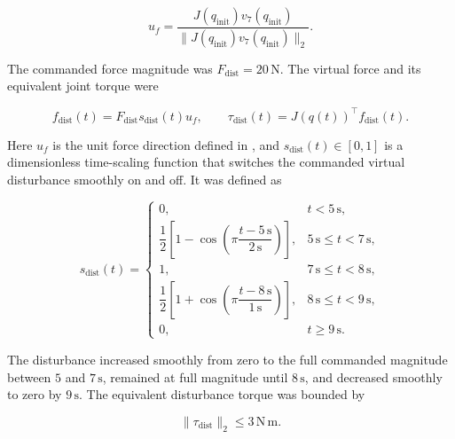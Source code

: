 \begin{equation}
u_f
=
\frac{J(q_{\mathrm{init}})v_7(q_{\mathrm{init}})}
{\lVert J(q_{\mathrm{init}})v_7(q_{\mathrm{init}})\rVert_2}.
\label{eq:nullspace_disturbance_direction}
\end{equation}


The commanded force magnitude was \(F_{\mathrm{dist}}=20\,\mathrm{N}\). The virtual force
and its equivalent joint torque were

\begin{equation}
f_{\mathrm{dist}}(t)=F_{\mathrm{dist}}s_{\mathrm{dist}}(t)u_f,
\qquad
\tau_{\mathrm{dist}}(t)
=
J(q(t))^\top f_{\mathrm{dist}}(t).
\label{eq:nullspace_automatic_disturbance}
\end{equation}

Here \(u_f\) is the unit force direction defined in
, and \(s_{\mathrm{dist}}(t)\in[0,1]\) is a
dimensionless time-scaling function that switches the commanded virtual
disturbance smoothly on and off. It was defined as

\begin{equation}
s_{\mathrm{dist}}(t)=
\begin{cases}
0,
& t<5\,\mathrm{s},\\[1mm]
\dfrac{1}{2}\left[
1-\cos\!\left(\pi\dfrac{t-5\,\mathrm{s}}{2\,\mathrm{s}}\right)
\right],
& 5\,\mathrm{s}\leq t<7\,\mathrm{s},\\[3mm]
1,
& 7\,\mathrm{s}\leq t<8\,\mathrm{s},\\[1mm]
\dfrac{1}{2}\left[
1+\cos\!\left(\pi\dfrac{t-8\,\mathrm{s}}{1\,\mathrm{s}}\right)
\right],
& 8\,\mathrm{s}\leq t<9\,\mathrm{s},\\[3mm]
0,
& t\geq9\,\mathrm{s}.
\end{cases}
\label{eq:nullspace_disturbance_scale}
\end{equation}

The disturbance increased smoothly from zero to the full commanded
magnitude between \(5\) and \(7\,\mathrm{s}\), remained at full magnitude
until \(8\,\mathrm{s}\), and decreased smoothly to zero by
\(9\,\mathrm{s}\). The equivalent disturbance torque was bounded by

\[
\lVert\tau_{\mathrm{dist}}\rVert_2\leq3\,\mathrm{N\,m}.
\]

